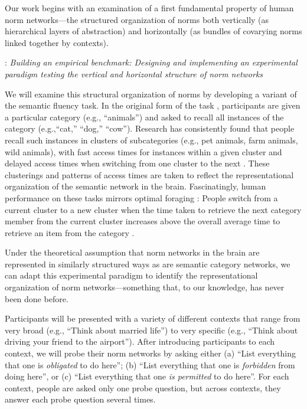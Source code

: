 \documentclass[12pt]{article}
\begin{document}
Our work begins with an examination of a first fundamental property of
human norm networks---the structured organization of norms both
vertically (as hierarchical layers of abstraction) and horizontally
(as bundles of covarying norms linked together by contexts).

\vskip 0.1in
: {\em Building an empirical benchmark:
  Designing and implementing an experimental paradigm testing the
  vertical and horizontal structure of norm networks} 
 \vspace{1mm}

\noindent We will examine this structural organization of norms by
developing a variant of the semantic fluency task.  In the original
form of the task \citep{bousfield44}, participants are given a
particular category (e.g., ``animals'') and asked to recall all
instances of the category (e.g.,``cat,'' ``dog,'' ``cow'').  Research
has consistently found that people recall such instances in clusters
of subcategories (e.g., pet animals, farm animals, wild animals), with
fast access times for instances within a given cluster and delayed
access times when switching from one cluster to the next
\citep{troyer97}. 
These clusterings and patterns of access times are
taken to reflect the representational organization of the semantic
network in the brain. Fascinatingly, human performance on these tasks
mirrors optimal foraging \citep{charnov78}: People switch from a
current cluster to a new cluster when the time taken to retrieve the
next category member from the current cluster increases above the
overall average time to retrieve an item from the category
\citep{hills12}.


Under the theoretical assumption that norm networks in the brain are
represented in similarly structured ways as are semantic category
networks, we can adapt this experimental paradigm to identify the
representational organization of norm networks---something that, to
our knowledge, has never been done before.

Participants will be presented with a variety of different contexts
that range from very broad (e.g., ``Think about married life'') to
very specific (e.g., ``Think about driving your friend to the
airport'').  After introducing participants to each context, we will
probe their norm networks by asking either (a) ``List everything that
one is \emph{obligated} to do here''; (b) ``List everything that one
is \emph{forbidden} from doing here'', or (c) ``List everything that
one \emph{is permitted} to do here''. For each context, people are
asked only one probe question, but across contexts, they answer each
probe question several times.
\end{document}
